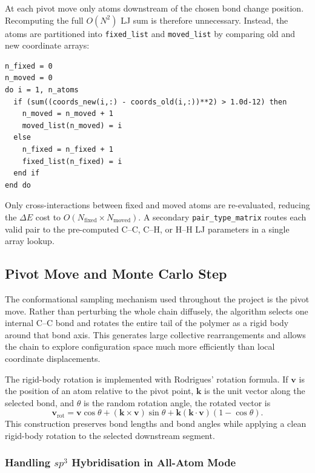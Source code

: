 At each pivot move only atoms downstream of the chosen bond change
position. Recomputing the full $O(N^2)$ LJ sum is therefore unnecessary.
Instead, the atoms are partitioned into \texttt{fixed\_list} and
\texttt{moved\_list} by comparing old and new coordinate arrays:

\begin{lstlisting}
n_fixed = 0
n_moved = 0
do i = 1, n_atoms
  if (sum((coords_new(i,:) - coords_old(i,:))**2) > 1.0d-12) then
    n_moved = n_moved + 1
    moved_list(n_moved) = i
  else
    n_fixed = n_fixed + 1
    fixed_list(n_fixed) = i
  end if
end do
\end{lstlisting}

Only cross-interactions between fixed and moved atoms are re-evaluated,
reducing the $\Delta E$ cost to $O(N_\mathrm{fixed} \times
N_\mathrm{moved})$. A secondary \texttt{pair\_type\_matrix} routes each
valid pair to the pre-computed C--C, C--H, or H--H LJ parameters in a
single array lookup.

\subsection{Pivot Move and Monte Carlo Step}
 
The conformational sampling mechanism used throughout the project is the
pivot move. Rather than perturbing the whole chain diffusely, the
algorithm selects one internal C--C bond and rotates the entire tail of
the polymer as a rigid body around that bond axis. This generates large
collective rearrangements and allows the chain to explore configuration
space much more efficiently than local coordinate displacements.

The rigid-body rotation is implemented with Rodrigues' rotation formula.
If \(\mathbf{v}\) is the position of an atom relative to the pivot
point, \(\mathbf{k}\) is the unit vector along the selected bond, and
\(\theta\) is the random rotation angle, the rotated vector is
\[
\mathbf{v}_{\mathrm{rot}}
=
\mathbf{v}\cos\theta
+
(\mathbf{k}\times\mathbf{v})\sin\theta
+
\mathbf{k}(\mathbf{k}\cdot\mathbf{v})(1-\cos\theta).
\]
This construction preserves bond lengths and bond angles while applying
a clean rigid-body rotation to the selected downstream segment.

\subsubsection{Handling $sp^3$ Hybridisation in All-Atom Mode}

